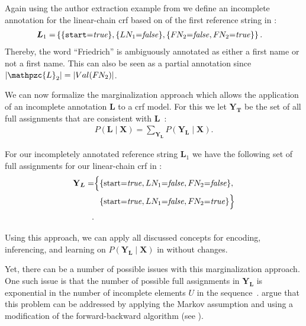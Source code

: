 Again using the author extraction example from  we define an incomplete annotation for the \gls{linear-chain crf} based on of the first reference string in :
\begin{equation*}
\begin{split}
  \bm{L}_1=&\left\{\{\texttt{start}{=}\mathit{true}\},\{LN_1{=}\mathit{false}\},\{F\hspace{-0.07em} N_2{=}\mathit{false},F\hspace{-0.07em} N_2{=}\mathit{true}\}\right\}.
\end{split}
\end{equation*}
Thereby, the word ``Friedrich'' is ambiguously annotated as either a first name or not a first name.
This can also be seen as a partial annotation since $|\mathpzc{L}_2|=|Val(F\rs N_2)|$.

\bigskip

We can now formalize the marginalization approach which allows the application of an incomplete annotation $\bm{L}$ to a \gls{crf} model.
For this we let $\mathbf{Y}_{\bm{T}}$ be the set of all \glspl{full assignment} that are consistent with $\bm{L}$~\citep{tsuboi2008training}:
\begin{equation}
  \label{equ:crf-marginalization}
  \begin{split}
    P\left(\bm{L}\mid\mathbf{X}\right)=\sum_{\mathbf{Y}_{\bm{L}}}P\left(\mathbf{Y}_{\bm{L}}\mid\mathbf{X}\right).
  \end{split}
\end{equation}

For our incompletely annotated reference string $\bm{L}_1$ we have the following set of \glspl{full assignment} for our \gls{linear-chain crf} in :
\begin{equation*}
\begin{split}
  \mathbf{Y}_{\bm{L}}=&\Big\{\{\text{start}{=}\mathit{true},LN_1{=}\mathit{false},F\rs N_2{=}\mathit{false}\},\\
  &\hphantom{\Big\{}\{\text{start}{=}\mathit{true},LN_1{=}\mathit{false},F\rs N_2{=}\mathit{true}\}\Big\}\\.
\end{split}
\end{equation*}

Using this approach, we can apply all discussed concepts for encoding, inferencing, and learning on $P\left(\mathbf{Y}_{\bm{L}}\mid\mathbf{X}\right)$ in  without changes.

\bigskip

Yet, there can be a number of possible issues with this marginalization approach.
One such issue is that the number of possible \glspl{full assignment} in $\mathbf{Y}_{\bm{L}}$ is exponential in the number of incomplete elements $U$ in the sequence~\citep{tsuboi2008training}.
\citep{tsuboi2008training} argue that this problem can be addressed by applying the Markov assumption and using a modification of the forward-backward algorithm (see ).

